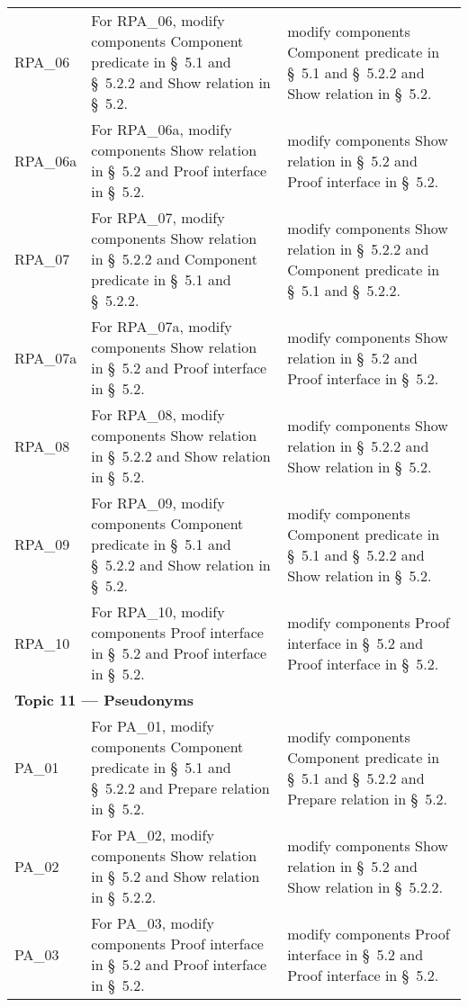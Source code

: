 \begin{landscape}
\begin{longtable}{p{3cm} p{10cm} p{7cm}}
RPA\_06 &
For RPA\_06, modify components Component predicate in \S~5.1 and \S~5.2.2 and Show relation in \S~5.2. &
modify components Component predicate in \S~5.1 and \S~5.2.2 and Show relation in \S~5.2. \\

RPA\_06a &
For RPA\_06a, modify components Show relation in \S~5.2 and Proof interface in \S~5.2. &
modify components Show relation in \S~5.2 and Proof interface in \S~5.2. \\

RPA\_07 &
For RPA\_07, modify components Show relation in \S~5.2.2 and Component predicate in \S~5.1 and \S~5.2.2. &
modify components Show relation in \S~5.2.2 and Component predicate in \S~5.1 and \S~5.2.2. \\

RPA\_07a &
For RPA\_07a, modify components Show relation in \S~5.2 and Proof interface in \S~5.2. &
modify components Show relation in \S~5.2 and Proof interface in \S~5.2. \\

RPA\_08 &
For RPA\_08, modify components Show relation in \S~5.2.2 and Show relation in \S~5.2. &
modify components Show relation in \S~5.2.2 and Show relation in \S~5.2. \\

RPA\_09 &
For RPA\_09, modify components Component predicate in \S~5.1 and \S~5.2.2 and Show relation in \S~5.2. &
modify components Component predicate in \S~5.1 and \S~5.2.2 and Show relation in \S~5.2. \\

RPA\_10 &
For RPA\_10, modify components Proof interface in \S~5.2 and Proof interface in \S~5.2. &
modify components Proof interface in \S~5.2 and Proof interface in \S~5.2. \\[1em]


\multicolumn{3}{l}{\textbf{Topic 11 — Pseudonyms}}\\

PA\_01 &
For PA\_01, modify components Component predicate in \S~5.1 and \S~5.2.2 and Prepare relation in \S~5.2. &
modify components Component predicate in \S~5.1 and \S~5.2.2 and Prepare relation in \S~5.2. \\

PA\_02 &
For PA\_02, modify components Show relation in \S~5.2 and Show relation in \S~5.2.2. &
modify components Show relation in \S~5.2 and Show relation in \S~5.2.2. \\

PA\_03 &
For PA\_03, modify components Proof interface in \S~5.2 and Proof interface in \S~5.2. &
modify components Proof interface in \S~5.2 and Proof interface in \S~5.2. \\


\end{longtable}
\end{landscape}
